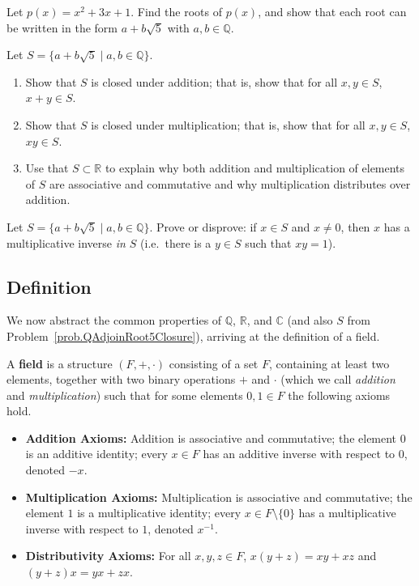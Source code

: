 \begin{problem}
Let $p(x) = x^2+3x+1$. Find the roots of $p(x)$, and show that each root can be written in the form $a+b\sqrt{5}$ with $a,b\in \mathbb{Q}$.
\end{problem}

\begin{problem}\label{prob.QAdjoinRoot5Closure}
Let $S=\{a+b\sqrt{5}\mid a,b\in \mathbb{Q}\}$. 
\begin{enumerate}
\item Show that $S$ is closed under addition; that is, show that for all $x,y\in S$, $x+y\in S$.
\item Show that $S$ is closed under multiplication; that is, show that for all $x,y\in S$, $xy\in S$.
\item Use that $S\subset \mathbb{R}$ to explain why both addition and multiplication of elements of $S$ are associative and commutative and why multiplication distributes over addition.
\end{enumerate}
\end{problem}

\begin{problem}\label{prob.QAdjoinRoot5Inverse}
Let $S=\{a+b\sqrt{5}\mid a,b\in \mathbb{Q}\}$. Prove or disprove: if $x\in S$ and $x\neq 0$, then $x$ has a multiplicative inverse \emph{in $S$} (i.e.~there is a $y\in S$ such that $xy=1$).
\end{problem}

\subsection{Definition}

We now abstract the common properties of $\mathbb{Q}$, $\mathbb{R}$, and $\mathbb{C}$ (and also $S$ from Problem~\ref{prob.QAdjoinRoot5Closure}), arriving at the definition of a field. 

\begin{definition}
A \textbf{field} is a structure $(F,+,\cdot)$ consisting of a set $F$, containing at least two elements, together with two binary operations $+$ and $\cdot$ (which we call \emph{addition} and \emph{multiplication}) such that for some elements $0,1\in F$ the following axioms hold.
\begin{itemize}
\item \textbf{Addition Axioms:} Addition is associative and commutative; the element $0$ is an additive identity; every  $x\in F$ has an additive inverse with respect to $0$, denoted $-x$.
\item \textbf{Multiplication Axioms:} Multiplication is associative and commutative; the element $1$ is a multiplicative identity;  every $x\in F\setminus\{0\}$ has a multiplicative inverse with respect to $1$, denoted $x^{-1}$.
\item \textbf{Distributivity Axioms:} For all $x,y,z \in F$, $x(y+z) = xy+xz$ and $(y+z)x = yx+zx$.
\end{itemize}
\end{definition}


